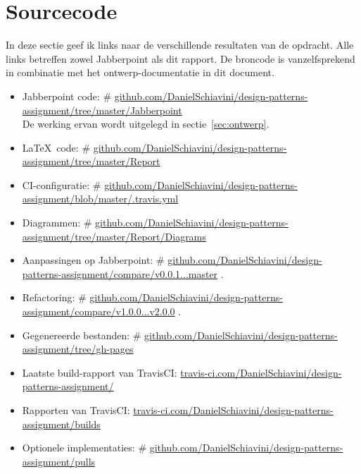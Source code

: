 \documentclass[a4paper]{article}
\makeatletter
\newcommand*{\repo}{\begingroup\@makeother\#\@repo}
\newcommand*{\@repo}[2]{%
  \href{https://github.com/DanielSchiavini/design-patterns-assignment/#1}{#2}%
  \endgroup}
\newcommand{\repolink}[1]{\repo{#1}{github.com\-/Daniel\-Schiavini\-/de\-sign-\-pat\-terns-\-as\-sign\-ment\-/#1}}
\newcommand{\cilink}[1]{\href{https://travis-ci.com/DanielSchiavini/design-patterns-assignment/#1}{travis-ci.com/DanielSchiavini/design-patterns-assignment/#1}}
\makeatother
\begin{document}
\section{Sourcecode}\label{sec:source}
	In deze sectie geef ik links naar de verschillende resultaten van de opdracht.
	Alle links betreffen zowel Jabberpoint als dit rapport.
	De broncode is vanzelfsprekend in combinatie met het ontwerp-documentatie in dit document.
	\begin{itemize}
		\item Jabberpoint code:
			\repolink{tree/master/Jabberpoint}\\
			De werking ervan wordt uitgelegd in sectie~\ref{sec:ontwerp}.
		\item \LaTeX ~code:
			\repo{tree/master/Report}{github.com/DanielSchiavini/design-patterns-assignment/tree\-/master\-/Report}
		\item CI-configuratie:
			\repolink{blob/master/.travis.yml}
		\item Diagrammen:
			\repo{tree/master/Report/Diagrams}{github.com/DanielSchiavini/design-patterns-assignment/tree\-/master\-/Report\-/Diagrams}
		\item Aanpassingen op Jabberpoint:
			\repolink{compare/v0.0.1...master}.
		\item Refactoring:
			\repolink{compare/v1.0.0...v2.0.0}.
		\item Gegenereerde bestanden:
			\repolink{tree/gh-pages}
		\item Laatste build-rapport van TravisCI:
			\cilink{}
		\item Rapporten van TravisCI:
			\cilink{builds}
		\item Optionele implementaties:
			\repolink{pulls}
	\end{itemize}
\end{document}
